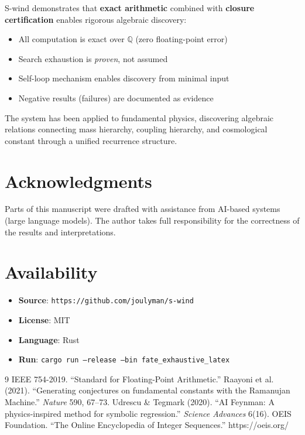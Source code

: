 \documentclass[11pt,a4paper]{article}
\begin{document}
S-wind demonstrates that \textbf{exact arithmetic} combined with 
\textbf{closure certification} enables rigorous algebraic discovery:
\begin{itemize}
    \item All computation is exact over $\mathbb{Q}$ (zero floating-point error)
    \item Search exhaustion is \emph{proven}, not assumed
    \item Self-loop mechanism enables discovery from minimal input
    \item Negative results (failures) are documented as evidence
\end{itemize}

The system has been applied to fundamental physics, discovering algebraic 
relations connecting mass hierarchy, coupling hierarchy, and cosmological 
constant through a unified recurrence structure.

\section*{Acknowledgments}

Parts of this manuscript were drafted with assistance from AI-based systems 
(large language models). The author takes full responsibility for the 
correctness of the results and interpretations.

\section*{Availability}

\begin{itemize}
    \item \textbf{Source}: \texttt{https://github.com/joulyman/s-wind}
    \item \textbf{License}: MIT
    \item \textbf{Language}: Rust
    \item \textbf{Run}: \texttt{cargo run --release --bin fate\_exhaustive\_latex}
\end{itemize}

\begin{thebibliography}{9}
 IEEE 754-2019. ``Standard for Floating-Point Arithmetic.''
 Raayoni et al. (2021). ``Generating conjectures on 
fundamental constants with the Ramanujan Machine.'' \textit{Nature} 590, 67--73.
 Udrescu \& Tegmark (2020). ``AI Feynman: A physics-inspired 
method for symbolic regression.'' \textit{Science Advances} 6(16).
 OEIS Foundation. ``The Online Encyclopedia of Integer Sequences.'' 
https://oeis.org/
\end{thebibliography}
\end{document}
